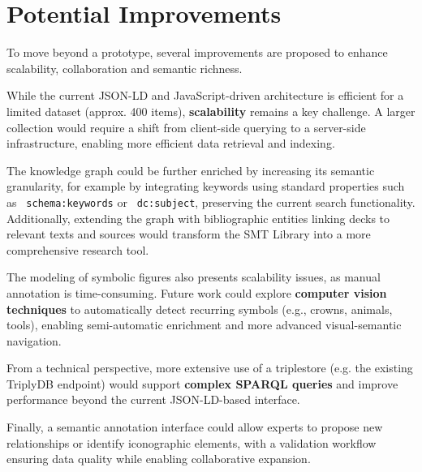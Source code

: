 \documentclass[11pt]{article}
\begin{document}
\section{Potential Improvements}
To move beyond a prototype, several improvements are proposed to enhance scalability, collaboration and semantic richness.

While the current JSON-LD and JavaScript-driven architecture is efficient for a limited dataset (approx. 400 items), \textbf{scalability} remains a key challenge. A larger collection would require a shift from client-side querying to a server-side infrastructure, enabling more efficient data retrieval and indexing.

The knowledge graph could be further enriched by increasing its semantic granularity, for example by integrating keywords using standard properties such as \texttt{ schema:keywords} or \texttt{ dc:subject}, preserving the current search functionality. Additionally, extending the graph with bibliographic entities linking decks to relevant texts and sources would transform the SMT Library into a more comprehensive research tool.

The modeling of symbolic figures also presents scalability issues, as manual annotation is time-consuming. Future work could explore \textbf{computer vision techniques} to automatically detect recurring symbols (e.g., crowns, animals, tools), enabling semi-automatic enrichment and more advanced visual-semantic navigation.

From a technical perspective, more extensive use of a triplestore (e.g. the existing TriplyDB endpoint) would support \textbf{complex SPARQL queries} and improve performance beyond the current JSON-LD-based interface.

Finally, a semantic annotation interface could allow experts to propose new relationships or identify iconographic elements, with a validation workflow ensuring data quality while enabling collaborative expansion.
\end{document}
